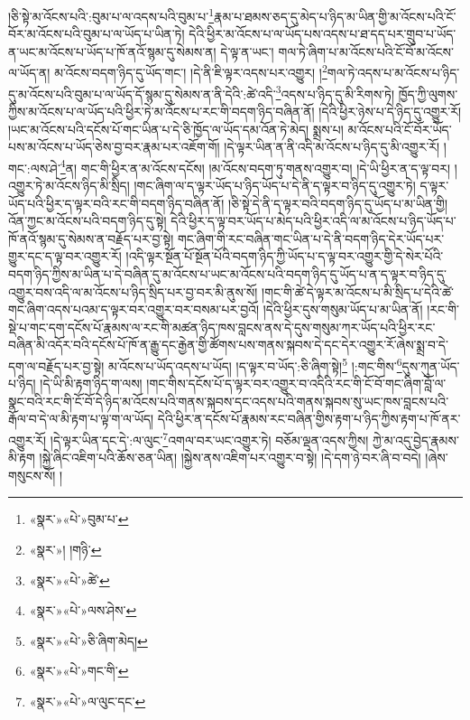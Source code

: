 །ཅི་སྟེ་མ་འོངས་པའི་:བུམ་པ་ལ་འདས་པའི་བུམ་པ་\footnote{«སྣར་»«པེ་»བུམ་པ་}རྣམ་པ་ཐམས་ཅད་དུ་མེད་པ་ཉིད་མ་ཡིན་གྱི་མ་འོངས་པའི་ངོ་བོར་མ་འོངས་པའི་བུམ་པ་ལ་ཡོད་པ་ཡིན་ཏེ། དེའི་ཕྱིར་མ་འོངས་པ་ལ་ཡོད་པས་འདས་པ་ཐ་དད་པར་གྲུབ་པ་ཡོད་ན་ཡང་མ་འོངས་པ་ཡོད་པ་ཁོ་ནའོ་སྙམ་དུ་སེམས་ན། དེ་ལྟ་ན་ཡང་། གལ་ཏེ་ཞིག་པ་མ་འོངས་པའི་ངོ་བོ་མ་འོངས་ལ་ཡོད་ན། མ་འོངས་བདག་ཉིད་དུ་ཡོད་གང་། །དེ་ནི་ཇི་ལྟར་འདས་པར་འགྱུར། །\footnote{«སྣར་»། །གཉི་}གལ་ཏེ་འདས་པ་མ་འོངས་པ་ཉིད་དུ་མ་འོངས་པའི་བུམ་པ་ལ་ཡོད་དོ་སྙམ་དུ་སེམས་ན་ནི་དེའི་:ཚེ་འདི་\footnote{«སྣར་»«པེ་»ཚེ་}འདས་པ་ཉིད་དུ་མི་རིགས་ཏེ། ཁྱོད་ཀྱི་ལུགས་ཀྱིས་མ་འོངས་པ་ལ་ཡོད་པའི་ཕྱིར་ཏེ་མ་འོངས་པ་རང་གི་བདག་ཉིད་བཞིན་ནོ། །དེའི་ཕྱིར་ཉེས་པ་དེ་ཉིད་དུ་འགྱུར་རོ། །ཡང་མ་འོངས་པའི་དངོས་པོ་གང་ཡིན་པ་དེ་ཅི་ཁྱོད་ལ་ཡོད་དམ་འོན་ཏེ་མེད། སྨྲས་པ། མ་འོངས་པའི་ངོ་བོར་ཡོད་པས་མ་འོངས་པ་ཡོད་ཅེས་བྱ་བར་རྣམ་པར་འཇོག་གོ། །དེ་ལྟར་ཡིན་ན་ནི་འདི་མ་འོངས་པ་ཉིད་དུ་མི་འགྱུར་རོ། །གང་:ལས་ཤེ་\footnote{«སྣར་»«པེ་»ལས་ཤེས་}ན། གང་གི་ཕྱིར་ན་མ་འོངས་དངོས། །མ་འོངས་བདག་ཏུ་གནས་འགྱུར་བ། །དེ་ཡི་ཕྱིར་ན་ད་ལྟ་བར། །འགྱུར་ཏེ་མ་འོངས་ཉིད་མི་སྲིད། །གང་ཞིག་ལ་ད་ལྟར་ཡོད་པ་ཉིད་ཡོད་པ་དེ་ནི་ད་ལྟར་བ་ཉིད་དུ་འགྱུར་ཏེ། ད་ལྟར་ཡོད་པའི་ཕྱིར་ད་ལྟར་བའི་རང་གི་བདག་ཉིད་བཞིན་ནོ། །ཅི་སྟེ་དེ་ནི་ད་ལྟར་བའི་བདག་ཉིད་དུ་ཡོད་པ་མ་ཡིན་གྱི། འོན་ཀྱང་མ་འོངས་པའི་བདག་ཉིད་དུ་སྟེ། དེའི་ཕྱིར་ད་ལྟ་བར་ཡོད་པ་མེད་པའི་ཕྱིར་འདི་ལ་མ་འོངས་པ་ཉིད་ཡོད་པ་ཁོ་ནའོ་སྙམ་དུ་སེམས་ན་བརྗོད་པར་བྱ་སྟེ། གང་ཞིག་གི་རང་བཞིན་གང་ཡིན་པ་དེ་ནི་བདག་ཉིད་དེར་ཡོད་པར་གྱུར་དང་ད་ལྟ་བར་འགྱུར་རོ། །འདི་ལྟར་སྔོན་པོ་སྔོན་པོའི་བདག་ཉིད་ཀྱི་ཡོད་པ་ད་ལྟ་བར་འགྱུར་གྱི་དེ་སེར་པོའི་བདག་ཉིད་ཀྱིས་མ་ཡིན་པ་དེ་བཞིན་དུ་མ་འོངས་པ་ཡང་མ་འོངས་པའི་བདག་ཉིད་དུ་ཡོད་པ་ན་ད་ལྟར་བ་ཉིད་དུ་འགྱུར་བས་འདི་ལ་མ་འོངས་པ་ཉིད་སྲིད་པར་བྱ་བར་མི་ནུས་སོ། །གང་གི་ཚེ་དེ་ལྟར་མ་འོངས་པ་མི་སྲིད་པ་དེའི་ཚེ་གང་ཞིག་འདས་པའམ་ད་ལྟར་བར་འགྱུར་བར་བསམ་པར་བྱའོ། །དེའི་ཕྱིར་དུས་གསུམ་ཡོད་པ་མ་ཡིན་ནོ། །རང་གི་སྡེ་པ་གང་དག་དངོས་པོ་རྣམས་ལ་རང་གི་མཚན་ཉིད་ཁས་བླངས་ནས་དེ་དུས་གསུམ་ཀར་ཡོད་པའི་ཕྱིར་རང་བཞིན་མི་འདོར་བའི་དངོས་པོ་ཁོ་ན་རྒྱུ་དང་རྒྱེན་གྱི་ཚོགས་པས་གནས་སྐབས་དེ་དང་དེར་འགྱུར་རོ་ཞེས་སྨྲ་བ་དེ་དག་ལ་བརྗོད་པར་བྱ་སྟེ། མ་འོངས་པ་ཡོད་འདས་པ་ཡོད། །ད་ལྟར་བ་ཡོད་:ཅི་ཞིག་སྟེ།\footnote{«སྣར་»«པེ་»ཅི་ཞིག་མེད།} །:གང་གིས་\footnote{«སྣར་»«པེ་»གང་གི་}དུས་ཀུན་ཡོད་པ་ཉིད། །དེ་ཡི་མི་རྟག་ཉིད་ག་ལས། །གང་གིས་དངོས་པོ་ད་ལྟར་བར་འགྱུར་བ་འདིའི་རང་གི་ངོ་བོ་གང་ཞིག་བློ་ལ་སྣང་བའི་རང་གི་ངོ་བོ་དེ་ཉིད་མ་འོངས་པའི་གནས་སྐབས་དང་འདས་པའི་གནས་སྐབས་སུ་ཡང་ཁས་བླངས་པའི་རྒོལ་བ་དེ་ལ་མི་རྟག་པ་ལྟ་ག་ལ་ཡོད། དེའི་ཕྱིར་ན་དངོས་པོ་རྣམས་རང་བཞིན་གྱིས་རྟག་པ་ཉིད་ཀྱིས་རྟག་པ་ཁོ་ནར་འགྱུར་རོ། །དེ་ལྟར་ཡིན་དང་དེ་:ལ་ལུང་\footnote{«སྣར་»«པེ་»ལ་ལུང་དང་}འགལ་བར་ཡང་འགྱུར་ཏེ། བཅོམ་ལྡན་འདས་ཀྱིས། ཀྱེ་མ་འདུ་བྱེད་རྣམས་མི་རྟག །སྐྱེ་ཞིང་འཇིག་པའི་ཆོས་ཅན་ཡིན། །སྐྱེས་ནས་འཇིག་པར་འགྱུར་བ་སྟེ། །དེ་དག་ཉེ་བར་ཞི་བ་བདེ། །ཞེས་གསུངས་སོ། །
